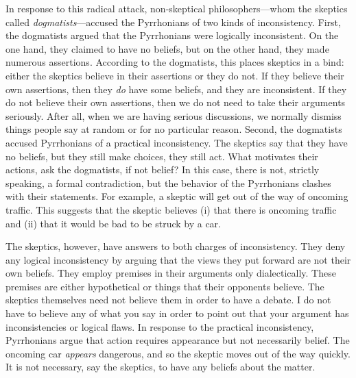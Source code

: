 In response to this radical attack, non-skeptical philosophers---whom the skeptics called \textit{dogmatists}---accused the Pyrrhonians of two kinds of inconsistency. First, the dogmatists argued that the Pyrrhonians were logically inconsistent. On the one hand, they claimed to have no beliefs, but on the other hand, they made numerous assertions. According to the dogmatists, this places skeptics in a bind: either the skeptics believe in their assertions or they do not. If they believe their own assertions, then they \textit{do} have some beliefs, and they are inconsistent. If they do not believe their own assertions, then we do not need to take their arguments seriously. After all, when we are having serious discussions, we normally dismiss things people say at random or for no particular reason. Second, the dogmatists accused Pyrrhonians of a practical inconsistency. The skeptics say that they have no beliefs, but they still make choices, they still act. What motivates their actions, ask the dogmatists, if not belief? In this case, there is not, strictly speaking, a formal contradiction, but the behavior of the Pyrrhonians clashes with their statements. For example, a skeptic will get out of the way of oncoming traffic. This suggests that the skeptic believes (i) that there is oncoming traffic and (ii) that it would be bad to be struck by a car.

The skeptics, however, have answers to both charges of inconsistency. They deny any logical inconsistency by arguing that the views they put forward are not their own beliefs. They employ premises in their arguments only dialectically. These premises are either hypothetical or things that their opponents believe. The skeptics themselves need not believe them in order to have a debate. I do not have to believe any of what you say in order to point out that your argument has inconsistencies or logical flaws. In response to the practical inconsistency, Pyrrhonians argue that action requires appearance but not necessarily belief. The oncoming car \textit{appears} dangerous, and so the skeptic moves out of the way quickly. It is not necessary, say the skeptics, to have any beliefs about the matter.

